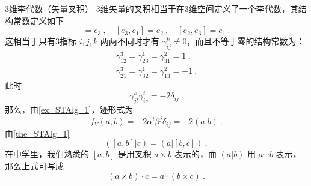 \begin{example}{3维李代数（矢量叉积）}
3维矢量的叉积相当于在3维空间定义了一个李代数，其结构常数定义如下
\begin{equation}
[e_1,e_2]=e_3~,\quad [e_3,e_1]=e_2~,\quad [e_2,e_3]=e_1~.
\end{equation}
这相当于只有3指标 $i,j,k$ 两两不同时才有 $\gamma_{ij}^k\neq0$，而且不等于零的结构常数为：
\begin{equation}
\begin{aligned}
\gamma_{12}^3=\gamma_{23}^1=\gamma_{31}^2=1~,\\
\gamma_{21}^3=\gamma_{32}^1=\gamma_{13}^2=-1~.
\end{aligned}
\end{equation}
此时
\begin{equation}
\gamma_{jt}^s\gamma_{is}^t=-2\delta_{ij}~.
\end{equation}
那么，由\autoref{ex_STAlg_1}，迹形式为
\begin{equation}
f_V(a,b)=-2\alpha^i\beta^j\delta_{ij}=-2(a|b)~.
\end{equation}
由\autoref{the_STAlg_1} 
\begin{equation}
([a,b]|c)=(a|[b,c])~,
\end{equation}
在中学里，我们熟悉的 $[a,b]$ 是用叉积 $a\times b$ 表示的，而 $(a|b)$ 用 $a\cdots b$ 表示，那么上式可写成
\begin{equation}
(a\times b)\cdot c=a\cdot(b\times c)~.
\end{equation}

\end{example}
